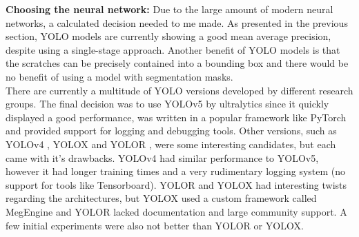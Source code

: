 \textbf{Choosing the neural network:}
Due to the large amount of modern neural networks, a calculated decision needed to me made. As presented in the previous section, YOLO models are currently showing a good mean average precision, despite using a single-stage approach. Another benefit of YOLO models is that the scratches can be precisely contained into a bounding box and there would be no benefit of using a model with segmentation masks. \\
There are currently a multitude of YOLO versions developed by different research groups. The final decision was to use YOLOv5 by ultralytics \cite{yolov5_git} since it quickly displayed a good performance, was written in a popular framework like PyTorch and provided support for logging and debugging tools. Other versions, such as YOLOv4 \cite{yolov4_paper}, YOLOX \cite{yolox_paper} and YOLOR \cite{yolor_paper}, were some interesting candidates, but each came with it's drawbacks. YOLOv4 had similar performance to YOLOv5, however it had longer training times and a very rudimentary logging system (no support for tools like Tensorboard). YOLOR and YOLOX had interesting twists regarding the architectures, but YOLOX used a custom framework called MegEngine \cite{megengine_git} and YOLOR lacked documentation and large community support. A few initial experiments were also not better than YOLOR or YOLOX. \\


